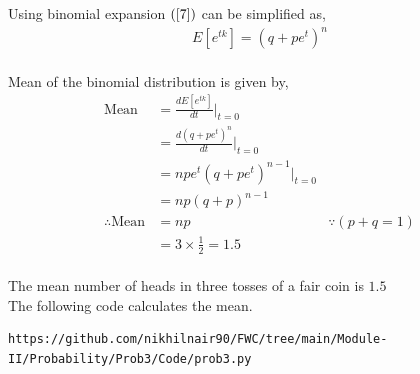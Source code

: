 \documentclass[journal,12pt,twocolumn]{IEEEtran}
\begin{document}
Using binomial expansion $(\ref{7})$ can be simplified as,
\begin{align}
E[e^{tk}]= (q + pe^t)^n
\end{align}
\\

Mean of the binomial distribution is given by,
\begin{align}
\text{Mean}&= \frac{dE[e^{tk}]}{dt}|_{t=0}&
\\
&= \frac{d(q + pe^t)^n}{dt}|_{t=0}&
\\
&=npe^t(q + pe^t)^{n-1}|_{t=0}&
\\
&= np(q + p)^{n-1}&
\\
\therefore \text{Mean} &= np& {}\because(p+q=1)
\\
&= 3\times\frac{1}{2}= 1.5&
\end{align}
\\

The mean number of heads in three tosses of a fair coin is $1.5$
\\

The following code calculates the mean.
\begin{lstlisting}
https://github.com/nikhilnair90/FWC/tree/main/Module-II/Probability/Prob3/Code/prob3.py
\end{lstlisting}
\end{document}
